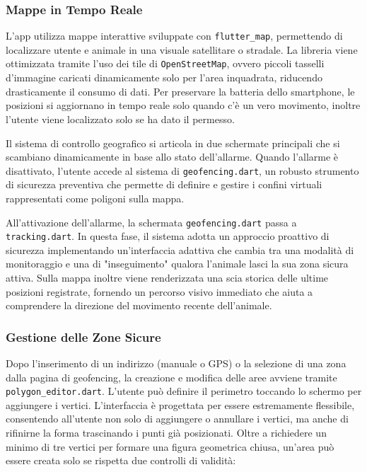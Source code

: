 \documentclass[12pt,a4paper]{article}
\begin{document}
\subsubsection{Mappe in Tempo Reale}

L’app utilizza mappe interattive sviluppate con \texttt{flutter\_map}, 
permettendo di localizzare utente e animale in una visuale satellitare o stradale. 
La libreria viene ottimizzata tramite l'uso dei tile di \texttt{OpenStreetMap}, 
ovvero piccoli tasselli d'immagine caricati dinamicamente solo per l'area inquadrata, 
riducendo drasticamente il consumo di dati. 
Per preservare la batteria dello smartphone, 
le posizioni si aggiornano in tempo reale solo quando c'è un vero movimento, 
inoltre l'utente viene localizzato solo se ha dato il permesso.

Il sistema di controllo geografico si articola in due schermate principali 
che si scambiano dinamicamente in base allo stato dell'allarme. 
Quando l'allarme è disattivato, l'utente accede al sistema di \texttt{geofencing.dart}, 
un robusto strumento di sicurezza preventiva che permette di definire e gestire
i confini virtuali rappresentati come poligoni sulla mappa. 

All'attivazione dell'allarme, la schermata \texttt{geofencing.dart} passa a \texttt{tracking.dart}. 
In questa fase, il sistema adotta un approccio proattivo di sicurezza 
implementando un'interfaccia adattiva che cambia tra una modalità 
di monitoraggio e una di "inseguimento" qualora l’animale lasci la sua zona sicura attiva. 
Sulla mappa inoltre viene renderizzata una scia storica 
delle ultime posizioni registrate, fornendo un percorso visivo immediato 
che aiuta a comprendere la direzione del movimento recente dell’animale. 

\subsubsection{Gestione delle Zone Sicure}

Dopo l’inserimento di un indirizzo (manuale o GPS) o 
la selezione di una zona dalla pagina di geofencing,
la creazione e modifica delle aree avviene tramite \texttt{polygon\_editor.dart}.
L’utente può definire il perimetro toccando lo schermo per aggiungere i vertici.
L'interfaccia è progettata per essere estremamente flessibile, 
consentendo all'utente non solo di aggiungere o annullare i vertici, 
ma anche di rifinirne la forma trascinando i punti già posizionati.
Oltre a richiedere un minimo di tre vertici per formare una figura geometrica chiusa, 
un'area può essere creata solo se rispetta due controlli di validità:
\end{document}
